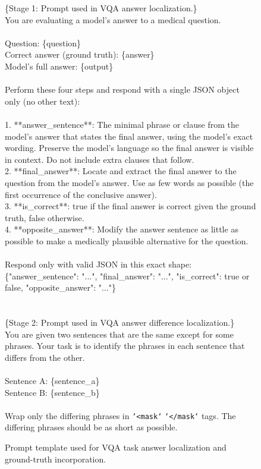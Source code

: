 \begin{figure}[ht]
\centering
\begin{tcolorbox}[colback=boxgray, colframe=black!70, boxrule=0.5pt, arc=0mm, left=8pt, right=8pt, top=8pt, bottom=8pt]
\small \ttfamily
\{Stage 1: Prompt used in VQA answer localization.\} \\
You are evaluating a model's answer to a medical question. \\
\\
Question: \{question\} \\
Correct answer (ground truth): \{answer\} \\
Model's full answer: \{output\} \\
\\
Perform these four steps and respond with a single JSON object only (no other text): \\
\\
1. **answer\_sentence**: The minimal phrase or clause from the model's answer that states the final answer, using the model's exact wording. Preserve the model's language so the final answer is visible in context. Do not include extra clauses that follow. \\
2. **final\_answer**: Locate and extract the final answer to the question from the model's answer. Use as few words as possible (the first occurrence of the conclusive answer). \\
3. **is\_correct**: true if the final answer is correct given the ground truth, false otherwise. \\
4. **opposite\_answer**: Modify the answer sentence as little as possible to make a medically plausible alternative for the question. \\
\\
Respond only with valid JSON in this exact shape: \\
\{"answer\_sentence": "...", "final\_answer": "...", "is\_correct": true or false, "opposite\_answer": "..."\} \\
\\
\\
\{Stage 2: Prompt used in VQA answer difference localization.\} \\
You are given two sentences that are the same except for some phrases. Your task is to identify the phrases in each sentence that differs from the other. \\
\\
Sentence A: \{sentence\_a\} \\
Sentence B: \{sentence\_b\} \\
\\
Wrap only the differing phrases in \texttt{`<mask\>`} \texttt{`</mask\>`} tags. The differing phrases should be as short as possible.
\end{tcolorbox}
\caption{Prompt template used for VQA task answer localization and ground-truth incorporation.}
\label{fig:prompt_stage1}
\end{figure}

